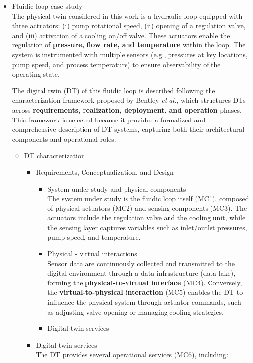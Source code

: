 \documentclass[
]{article}
\providecommand{\tightlist}{%
  \setlength{\itemsep}{0pt}\setlength{\parskip}{0pt}}
\begin{document}
\begin{itemize}
\item
  Fluidic loop case study\\
  The physical twin considered in this work is a hydraulic loop equipped
  with three actuators: (i) pump rotational speed, (ii) opening of a
  regulation valve, and (iii) activation of a cooling on/off valve.
  These actuators enable the regulation of \textbf{pressure, flow rate,
  and temperature} within the loop. The system is instrumented with
  multiple sensors (e.g., pressures at key locations, pump speed, and
  process temperature) to ensure observability of the operating state.

  The digital twin (DT) of this fluidic loop is described following the
  characterization framework proposed by Bentley \emph{et al.}, which
  structures DTs across \textbf{requirements, realization, deployment,
  and operation} phases. This framework is selected because it provides
  a formalized and comprehensive description of DT systems, capturing
  both their architectural components and operational roles.

  \begin{itemize}
  \item
    DT characterization

    \begin{itemize}
    \item
      Requirements, Conceptualization, and Design

      \begin{itemize}
      \tightlist
      \item
        System under study and physical components\\
        The system under study is the fluidic loop itself (MC1),
        composed of physical actuators (MC2) and sensing components
        (MC3). The actuators include the regulation valve and the
        cooling unit, while the sensing layer captures variables such as
        inlet/outlet pressures, pump speed, and temperature.
      \item
        Physical - virtual interactions\\
        Sensor data are continuously collected and transmitted to the
        digital environment through a data infrastructure (data lake),
        forming the \textbf{physical-to-virtual interface} (MC4).
        Conversely, the \textbf{virtual-to-physical interaction} (MC5)
        enables the DT to influence the physical system through actuator
        commands, such as adjusting valve opening or managing cooling
        strategies.
      \item
        Digital twin services
      \end{itemize}
    \item
      Digital twin services\\
      The DT provides several operational services (MC6), including:


\end{itemize}
\end{itemize}
\end{itemize}
\end{document}
